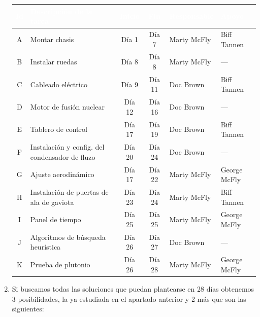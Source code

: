 \documentclass[11pt]{article}
\begin{document}
\begin{enumerate}[label=\alph*)]
    \begin{table}[H]
        \centering
        \small
        \renewcommand{\arraystretch}{1.2}
        \begin{tabular}{|c|p{8cm}|c|c|l|l|}
            \hline
            \rowcolor{maincolor}
            \textcolor{white}{\textbf{Id}} & 
            \textcolor{white}{\textbf{Descripción de la tarea}} & 
            \textcolor{white}{\textbf{Inicio}} & 
            \textcolor{white}{\textbf{Fin}} & 
            \textcolor{white}{\textbf{Responsable}} &
            \textcolor{white}{\textbf{Apoyo}} \\ 
            \hline
            A & Montar chasis & Día 1 & Día 7 & Marty McFly & Biff Tannen \\ 
            B & Instalar ruedas & Día 8 & Día 8 & Marty McFly & --- \\ 
            C & Cableado eléctrico & Día 9 & Día 11 & Doc Brown & Biff Tannen \\ 
            D & Motor de fusión nuclear & Día 12 & Día 16 & Doc Brown & --- \\ 
            E & Tablero de control & Día 17 & Día 19 & Doc Brown & Biff Tannen \\ 
            F & Instalación y config. del condensador de fluzo & Día 20 & Día 24 & Doc Brown & --- \\ 
            G & Ajuste aerodinámico & Día 17 & Día 22 & Marty McFly & George McFly \\ 
            H & Instalación de puertas de ala de gaviota & Día 23 & Día 24 & Marty McFly & Biff Tannen \\ 
            I & Panel de tiempo & Día 25 & Día 25 & Marty McFly & George McFly \\ 
            J & Algoritmos de búsqueda heurística & Día 26 & Día 27 & Doc Brown & --- \\ 
            K & Prueba de plutonio & Día 26 & Día 28 & Marty McFly & George McFly \\ \hline
        \end{tabular}
    \end{table}

    \item Si buscamos todas las soluciones que puedan plantearse en 28 días obtenemos 3 posibilidades, la ya estudiada en el apartado anterior y 2 más que son las siguientes:


\end{enumerate}
\end{document}
